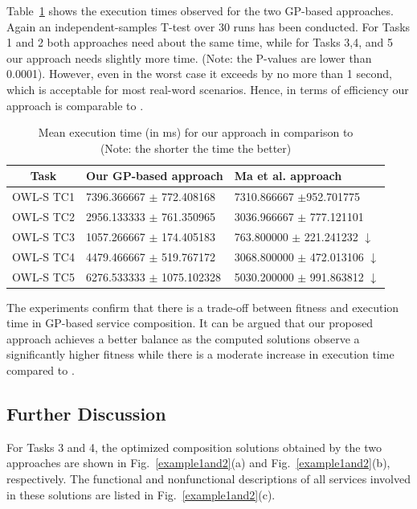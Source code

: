 Table~\ref{meanTime} shows the execution times observed for the two GP-based approaches. Again an independent-samples T-test over 30 runs has been conducted. For Tasks 1 and 2 both approaches need about the same time, while for Tasks 3,4, and 5 our approach needs slightly more time. (Note: the P-values are lower than 0.0001). However, even in the worst case it exceeds \cite{ma2015hybrid} by no more than 1 second, which is acceptable for most real-word scenarios. Hence, in terms of efficiency our approach is comparable to \cite{ma2015hybrid}.
\begin{table}[h!tb]
\footnotesize
\centering
\caption{Mean execution time (in ms) for our approach in comparison to \cite{ma2015hybrid}\\ (Note: the shorter the time the better)}
\label{meanTime}
\begin{tabular}{l|l|l}
\hline
\multicolumn{1}{c|}{Task} & Our GP-based approach            & Ma et al. approach \cite{ma2015hybrid}     \\ \hline
OWL-S TC1                     & 7396.366667 $\pm$  772.408168    &  7310.866667  $\pm$952.701775                       \\ \hline
OWL-S TC2                     & 2956.133333  $\pm$ 761.350965    &  3036.966667 $\pm$ 777.121101                       \\ \hline
OWL-S TC3                     & 1057.266667  $\pm$ 174.405183    &  763.800000 $\pm$ 221.241232  $\downarrow$          \\ \hline
OWL-S TC4                     & 4479.466667  $\pm$ 519.767172    &  3068.800000 $\pm$ 472.013106  $\downarrow$        \\ \hline
OWL-S TC5                     & 6276.533333  $\pm$ 1075.102328   &  5030.200000 $\pm$ 991.863812 $\downarrow$         \\ \hline
\end{tabular}
\end{table}

The experiments confirm that there is a trade-off between fitness and execution time in GP-based service composition. It can be argued that our proposed approach achieves a better balance as the computed solutions observe a significantly higher fitness while there is a moderate increase in execution time compared to \cite{ma2015hybrid}. 

\subsection{Further Discussion}
For Tasks 3 and 4, the optimized composition solutions obtained by the two approaches are shown in Fig.~\ref{example1and2}(a) and Fig.~\ref{example1and2}(b), respectively. The functional and nonfunctional descriptions of all services involved in these solutions are listed in Fig.~\ref{example1and2}(c). 

